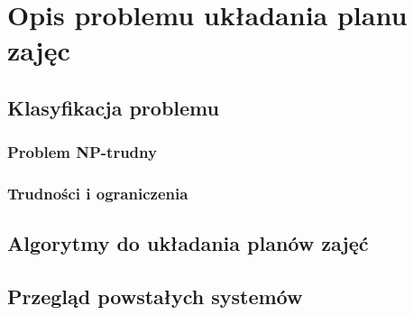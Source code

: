 \chapter{Opis problemu układania planu zajęc}
\section{Klasyfikacja problemu}
\subsection{Problem NP-trudny}
\subsection{Trudności i ograniczenia}
\section{Algorytmy do układania planów zajęć}
\section{Przegląd powstałych systemów}